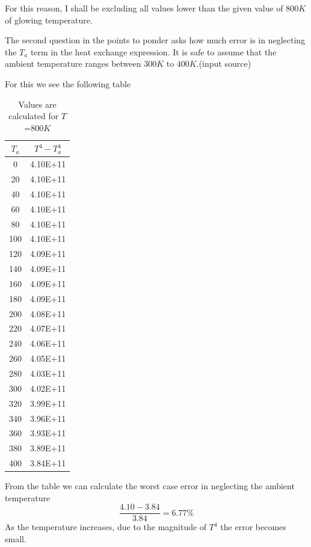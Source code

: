 \documentclass[12pt]{article}
\begin{document}
For this reason, I shall be excluding all values lower than the given value of $800K$ of glowing temperature.

The second question in the points to ponder asks how much error is in neglecting the $T_a$ term in the heat exchange expression.
It is safe to assume that the ambient temperature ranges between $300K$ to $400K$.(input source)

For this we see the following table
\begin{table}[!ht]
    \centering
    \begin{tabular}{|c|c|}
    \hline
        $T_a$ & $T^4-T_a^4$ \\ \hline
        0 & 4.10E+11 \\ \hline
        20 & 4.10E+11 \\ \hline
        40 & 4.10E+11 \\ \hline
        60 & 4.10E+11 \\ \hline
        80 & 4.10E+11 \\ \hline
        100 & 4.10E+11 \\ \hline
        120 & 4.09E+11 \\ \hline
        140 & 4.09E+11 \\ \hline
        160 & 4.09E+11 \\ \hline
        180 & 4.09E+11 \\ \hline
        200 & 4.08E+11 \\ \hline
        220 & 4.07E+11 \\ \hline
        240 & 4.06E+11 \\ \hline
        260 & 4.05E+11 \\ \hline
        280 & 4.03E+11 \\ \hline
        300 & 4.02E+11 \\ \hline
        320 & 3.99E+11 \\ \hline
        340 & 3.96E+11 \\ \hline
        360 & 3.93E+11 \\ \hline
        380 & 3.89E+11 \\ \hline
        400 & 3.84E+11 \\ \hline
    \end{tabular}
    \caption{Values are calculated for $T$=800$K$}
\end{table}

\noindent From the table we can calculate the worst case error in  neglecting the ambient temperature
\[\frac{4.10-3.84}{3.84}=6.77\%\]
As the temperature increases, due to the magnitude of $T^4$ the error becomes small.
\end{document}
